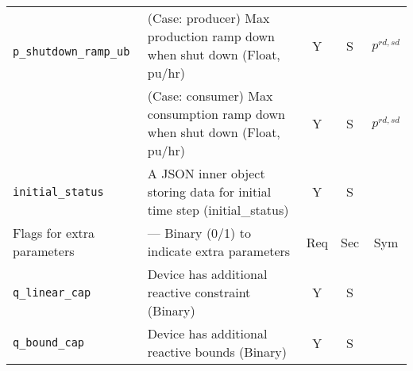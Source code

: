 \documentclass{article}
\begin{document}
\begin{center}
\begin{tabular}{ l | l | c | c | c |}
  {\tt\color{red} p\_shutdown\_ramp\_ub}& {(Case: producer) Max production ramp down when shut down (Float, pu/hr)} & Y & S & $p^{rd,sd}$\\
                             & {(Case: consumer) Max consumption ramp down when shut down (Float, pu/hr)} & Y & S & $p^{rd,sd}$\\
  \hline
  {\tt initial\_status} & A JSON inner object storing data for initial time step (initial\_status) & Y & S &  \\
  \hline
  Flags for extra parameters & --- Binary (0/1) to indicate extra parameters & Req & Sec & Sym\\
   \hline
  {\tt q\_linear\_cap}      & Device has additional reactive constraint (Binary) & Y & S & \\
  {\tt q\_bound\_cap}       & Device has additional reactive bounds (Binary) & Y & S & \\
  \hline
\end{tabular}
\end{center}
\end{document}
